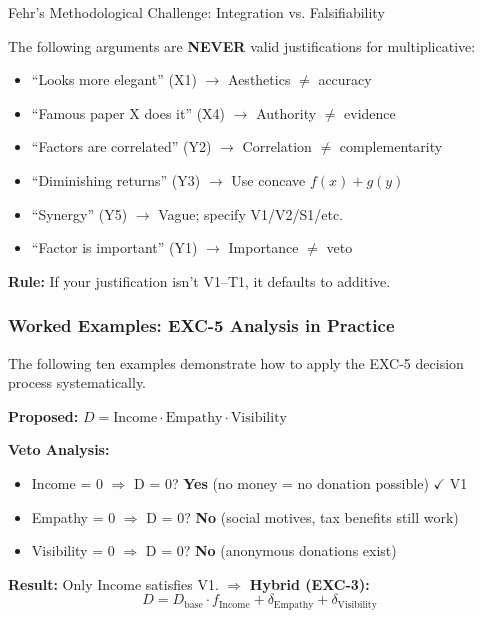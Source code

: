 \begin{chapter}{Fehr's Methodological Challenge: Integration vs. Falsifiability}
\begin{tcolorbox}[colback=red!5!white,colframe=red!75!black,title=Common Mistakes (Auto-Reject)]
The following arguments are \textbf{NEVER} valid justifications for multiplicative:
\begin{itemize}[noitemsep]
    \item ``Looks more elegant'' (X1) $\rightarrow$ Aesthetics $\neq$ accuracy
    \item ``Famous paper X does it'' (X4) $\rightarrow$ Authority $\neq$ evidence
    \item ``Factors are correlated'' (Y2) $\rightarrow$ Correlation $\neq$ complementarity
    \item ``Diminishing returns'' (Y3) $\rightarrow$ Use concave $f(x) + g(y)$
    \item ``Synergy'' (Y5) $\rightarrow$ Vague; specify V1/V2/S1/etc.
    \item ``Factor is important'' (Y1) $\rightarrow$ Importance $\neq$ veto
\end{itemize}
\textbf{Rule:} If your justification isn't V1--T1, it defaults to additive.
\end{tcolorbox}

\subsubsection{Worked Examples: EXC-5 Analysis in Practice}

The following ten examples demonstrate how to apply the EXC-5 decision process systematically.

\begin{example}
\label{ex:exc-donation}
\textbf{Proposed:} $D = \text{Income} \cdot \text{Empathy} \cdot \text{Visibility}$

\textbf{Veto Analysis:}
\begin{itemize}[noitemsep]
    \item Income = 0 $\Rightarrow$ D = 0? \textbf{Yes} (no money = no donation possible) $\checkmark$ V1
    \item Empathy = 0 $\Rightarrow$ D = 0? \textbf{No} (social motives, tax benefits still work)
    \item Visibility = 0 $\Rightarrow$ D = 0? \textbf{No} (anonymous donations exist)
\end{itemize}

\textbf{Result:} Only Income satisfies V1. $\Rightarrow$ \textbf{Hybrid (EXC-3):}
\begin{equation}
D = D_{\text{base}} \cdot f_{\text{Income}} + \delta_{\text{Empathy}} + \delta_{\text{Visibility}}
\end{equation}
\end{example}


\end{chapter}
